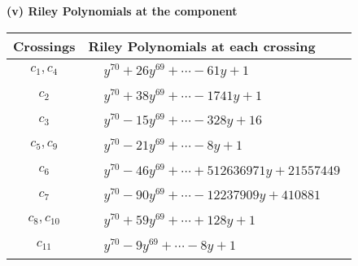 \documentclass[1p]{elsarticle_modified}
\theoremstyle{definition}
\begin{document}
\newpage\renewcommand{\arraystretch}{1}
\flushleft \textbf{(v) Riley Polynomials at the component}\newline \\
\begin{tabular}{m{50pt}|m{274pt}}
Crossings & \hspace{64pt}Riley Polynomials at each crossing \\
\hline $$\begin{aligned}c_{1},c_{4}\end{aligned}$$&$\begin{aligned}
&y^{70}+26 y^{69}+\cdots-61 y+1
\end{aligned}$\\
\hline $$\begin{aligned}c_{2}\end{aligned}$$&$\begin{aligned}
&y^{70}+38 y^{69}+\cdots-1741 y+1
\end{aligned}$\\
\hline $$\begin{aligned}c_{3}\end{aligned}$$&$\begin{aligned}
&y^{70}-15 y^{69}+\cdots-328 y+16
\end{aligned}$\\
\hline $$\begin{aligned}c_{5},c_{9}\end{aligned}$$&$\begin{aligned}
&y^{70}-21 y^{69}+\cdots-8 y+1
\end{aligned}$\\
\hline $$\begin{aligned}c_{6}\end{aligned}$$&$\begin{aligned}
&y^{70}-46 y^{69}+\cdots+512636971 y+21557449
\end{aligned}$\\
\hline $$\begin{aligned}c_{7}\end{aligned}$$&$\begin{aligned}
&y^{70}-90 y^{69}+\cdots-12237909 y+410881
\end{aligned}$\\
\hline $$\begin{aligned}c_{8},c_{10}\end{aligned}$$&$\begin{aligned}
&y^{70}+59 y^{69}+\cdots+128 y+1
\end{aligned}$\\
\hline $$\begin{aligned}c_{11}\end{aligned}$$&$\begin{aligned}
&y^{70}-9 y^{69}+\cdots-8 y+1
\end{aligned}$\\
\hline
\end{tabular}\\~\\
\end{document}
